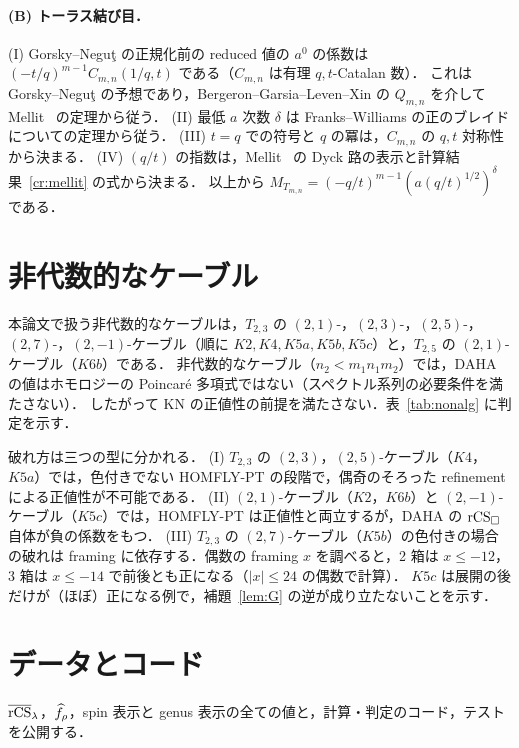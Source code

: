 \paragraph{(B) トーラス結び目．}
(I) Gorsky--Neguţ の正規化前の reduced 値の $a^0$ の係数は $(-t/q)^{m-1}C_{m,n}(1/q,t)$ である（$C_{m,n}$ は有理 $q,t$-Catalan 数）．
これは Gorsky--Neguţ の予想であり，Bergeron--Garsia--Leven--Xin の $Q_{m,n}$ を介して Mellit~\cite{Mellit16} の定理から従う．
(II) 最低 $a$ 次数 $\delta$ は Franks--Williams の正のブレイドについての定理から従う．
(III) $t=q$ での符号と $q$ の冪は，$C_{m,n}$ の $q,t$ 対称性から決まる．
(IV) $(q/t)$ の指数は，Mellit~\cite{Mellit17} の Dyck 路の表示と計算結果~\ref{cr:mellit} の式から決まる．
以上から $M_{T_{m,n}}=(-q/t)^{m-1}(a(q/t)^{1/2})^{\delta}$ である．

\section{非代数的なケーブル}\label{app:nonalg}
本論文で扱う非代数的なケーブルは，$T_{2,3}$ の $(2,1)$-，$(2,3)$-，$(2,5)$-，$(2,7)$-，$(2,-1)$-ケーブル（順に $K2,K4,K5a,K5b,K5c$）と，$T_{2,5}$ の $(2,1)$-ケーブル（$K6b$）である．
非代数的なケーブル（$n_2<m_1n_1m_2$）では，DAHA の値はホモロジーの Poincaré 多項式ではない（スペクトル系列の必要条件を満たさない）．
したがって KN の正値性の前提を満たさない．表~\ref{tab:nonalg} に判定を示す．
\begin{table}[h]
\centering
\caption{非代数的なケーブルの判定（framing 0）．各欄は「spin 表示の負の項の数/項数; genus 表示の負の項の数/項数」（全体の符号はそれぞれで良い方）．}\label{tab:nonalg}
\resizebox{\textwidth}{!}{}
\end{table}
破れ方は三つの型に分かれる．
(I) $T_{2,3}$ の $(2,3)$，$(2,5)$-ケーブル（$K4$，$K5a$）では，色付きでない HOMFLY-PT の段階で，偶奇のそろった refinement による正値性が不可能である．
(II) $(2,1)$-ケーブル（$K2$，$K6b$）と $(2,-1)$-ケーブル（$K5c$）では，HOMFLY-PT は正値性と両立するが，DAHA の $\textrm{rCS}_\square$ 自体が負の係数をもつ．
(III) $T_{2,3}$ の $(2,7)$-ケーブル（$K5b$）の色付きの場合の破れは framing に依存する．偶数の framing $x$ を調べると，2 箱は $x\le-12$，3 箱は $x\le-14$ で前後とも正になる（$|x|\le24$ の偶数で計算）．
$K5c$ は展開の後だけが（ほぼ）正になる例で，補題~\ref{lem:G} の逆が成り立たないことを示す．

\section{データとコード}\label{app:data}
$\overline{\textrm{rCS}}_\lambda$，$\widehat{f}_\rho$，spin 表示と genus 表示の全ての値と，計算・判定のコード，テストを公開する．
